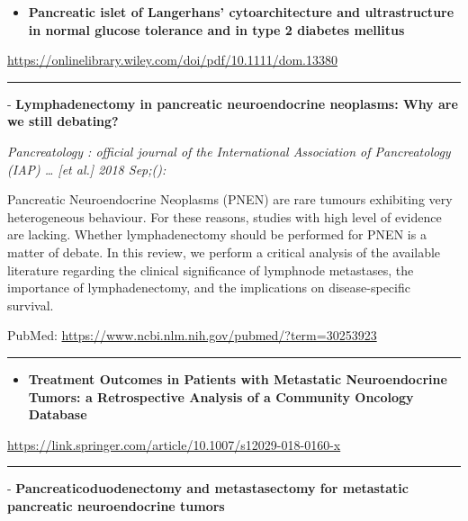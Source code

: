 \documentclass[]{article}
\providecommand{\tightlist}{%
  \setlength{\itemsep}{0pt}\setlength{\parskip}{0pt}}
\begin{document}
\begin{itemize}
\tightlist
\item
  \textbf{Pancreatic islet of Langerhans' cytoarchitecture and
  ultrastructure in normal glucose tolerance and in type 2 diabetes
  mellitus}
\end{itemize}

\url{https://onlinelibrary.wiley.com/doi/pdf/10.1111/dom.13380}

\begin{center}\rule{0.5\linewidth}{\linethickness}\end{center}

 - \textbf{Lymphadenectomy in pancreatic neuroendocrine neoplasms: Why
are we still debating?}

\emph{Pancreatology : official journal of the International Association
of Pancreatology (IAP) \ldots{} {[}et al.{]} 2018 Sep;():}

Pancreatic Neuroendocrine Neoplasms (PNEN) are rare tumours exhibiting
very heterogeneous behaviour. For these reasons, studies with high level
of evidence are lacking. Whether lymphadenectomy should be performed for
PNEN is a matter of debate. In this review, we perform a critical
analysis of the available literature regarding the clinical significance
of lymphnode metastases, the importance of lymphadenectomy, and the
implications on disease-specific survival.

PubMed: \url{https://www.ncbi.nlm.nih.gov/pubmed/?term=30253923}

{}

{}

\begin{center}\rule{0.5\linewidth}{\linethickness}\end{center}

\begin{itemize}
\tightlist
\item
  \textbf{Treatment Outcomes in Patients with Metastatic Neuroendocrine
  Tumors: a Retrospective Analysis of a Community Oncology Database}
\end{itemize}

\url{https://link.springer.com/article/10.1007/s12029-018-0160-x}

\begin{center}\rule{0.5\linewidth}{\linethickness}\end{center}

 - \textbf{Pancreaticoduodenectomy and metastasectomy for metastatic
pancreatic neuroendocrine tumors}
\end{document}
